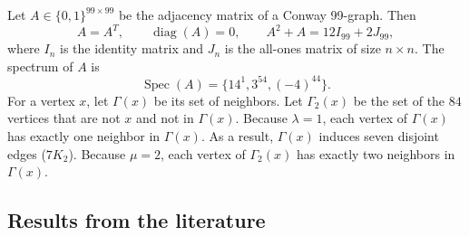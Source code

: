 \documentclass{article}
\theoremstyle{plain}
\theoremstyle{definition}
\DeclareMathOperator{\Spec}{Spec}
\numberwithin{equation}{section}
\begin{document}
Let $A \in \{0,1\}^{99 \times 99}$ be the adjacency matrix of a Conway 99-graph. Then
\begin{equation}
 A = A^T, \qquad \operatorname{diag}(A) = 0, \qquad A^2 + A = 12I_{99} + 2J_{99},
 \label{eq:matrix}
\end{equation}
where $I_n$ is the identity matrix and $J_n$ is the all-ones matrix of size $n \times n$.
The spectrum of $A$ is
\begin{equation}
 \Spec(A) = \{14^1, 3^{54}, (-4)^{44}\}.
 \label{eq:spectrum}
\end{equation}
For a vertex $x$, let $\Gamma(x)$ be its set of neighbors. Let $\Gamma_2(x)$ be the set of the $84$ vertices that are not $x$ and not in $\Gamma(x)$.
Because $\lambda = 1$, each vertex of $\Gamma(x)$ has exactly one neighbor in $\Gamma(x)$.
As a result, $\Gamma(x)$ induces seven disjoint edges ($7K_2$).
Because $\mu = 2$, each vertex of $\Gamma_2(x)$ has exactly two neighbors in $\Gamma(x)$.

\subsection{Results from the literature}
\end{document}
